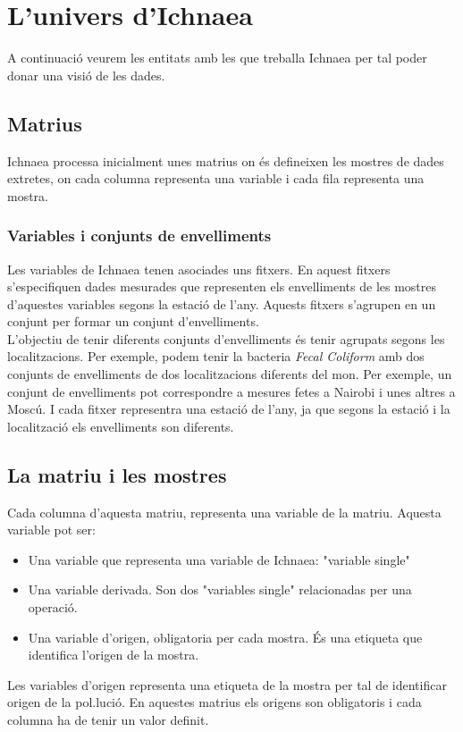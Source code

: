 \section{L'univers d'Ichnaea}
A continuaci\'{o} veurem les entitats amb les que treballa Ichnaea per tal poder donar una visi\'{o} de les dades.

\subsection{Matrius}
\label{cha:backgroud:univers:matrius}
Ichnaea processa inicialment unes matrius on \'e{s} defineixen les mostres de dades extretes, on cada columna representa una variable i cada fila representa una mostra. 

\subsubsection{Variables i conjunts de envelliments}
\label{cha:backgroud:univers:matrius:variables_seasons}
Les variables de Ichnaea tenen asociades uns fitxers. En aquest fitxers s'especifiquen dades mesurades que representen els envelliments de les mostres d'aquestes variables segons la estaci\'{o} de l'any. Aquests fitxers s'agrupen en un conjunt per formar un conjunt d'envelliments.\\

L'objectiu de tenir diferents conjunts d'envelliments \'{e}s tenir agrupats segons les localitzacions. Per exemple, podem tenir la bacteria \textit{Fecal Coliform} amb dos conjunts de envelliments de dos localitzacions diferents del mon. Per exemple, un conjunt de envelliments pot correspondre a mesures fetes a Nairobi i unes altres a Mosc\'{u}. I cada fitxer representra una estaci\'{o} de l'any, ja que segons la estaci\'{o} i la localitzaci\'{o} els envelliments son diferents.\\

\subsection{La matriu i les mostres}
Cada columna d'aquesta matriu, representa una variable de la matriu. Aquesta variable pot ser:\\
\begin{itemize}
\item Una variable que representa una variable de Ichnaea: "variable single"
\item Una variable derivada. Son dos "variables single" relacionadas per una operaci\'{o}.
\item Una variable d'origen, obligatoria per cada mostra. \'{E}s una etiqueta que identifica l'origen de la mostra.
\end{itemize}
Les variables d'origen representa una etiqueta de la mostra per tal de identificar origen de la pol.luci\'{o}. En aquestes matrius els origens son obligatoris i cada columna ha de tenir un valor definit.\\

